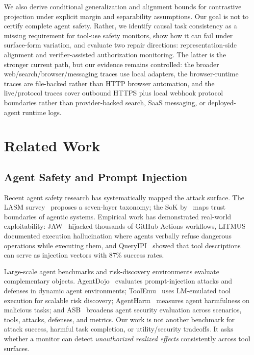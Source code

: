 \documentclass{article}
\begin{document}
We also derive conditional generalization and alignment bounds for contrastive projection under explicit margin and separability assumptions. Our goal is not to certify complete agent safety. Rather, we identify causal task consistency as a missing requirement for tool-use safety monitors, show how it can fail under surface-form variation, and evaluate two repair directions: representation-side alignment and verifier-assisted authorization monitoring. The latter is the stronger current path, but our evidence remains controlled: the broader web/search/browser/messaging traces use local adapters, the browser-runtime traces are file-backed rather than HTTP browser automation, and the live/protocol traces cover outbound HTTPS plus local webhook protocol boundaries rather than provider-backed search, SaaS messaging, or deployed-agent runtime logs.

\section{Related Work}

\subsection{Agent Safety and Prompt Injection}

Recent agent safety research has systematically mapped the attack surface. The LASM survey~\cite{lasm2026} proposes a seven-layer taxonomy; the SoK by~\cite{sok2026} maps trust boundaries of agentic systems. Empirical work has demonstrated real-world exploitability: JAW~\cite{jaw2026} hijacked thousands of GitHub Actions workflows, LITMUS~\cite{litmus2026} documented execution hallucination where agents verbally refuse dangerous operations while executing them, and QueryIPI~\cite{queryipi2026} showed that tool descriptions can serve as injection vectors with 87\% success rates.

Large-scale agent benchmarks and risk-discovery environments evaluate complementary objects. AgentDojo~\cite{agentdojo2024} evaluates prompt-injection attacks and defenses in dynamic agent environments; ToolEmu~\cite{toolemu2024} uses LM-emulated tool execution for scalable risk discovery; AgentHarm~\cite{agentharm2025} measures agent harmfulness on malicious tasks; and ASB~\cite{asb2025} broadens agent security evaluation across scenarios, tools, attacks, defenses, and metrics. Our work is not another benchmark for attack success, harmful task completion, or utility/security tradeoffs. It asks whether a monitor can detect \emph{unauthorized realized effects} consistently across tool surfaces.
\end{document}
